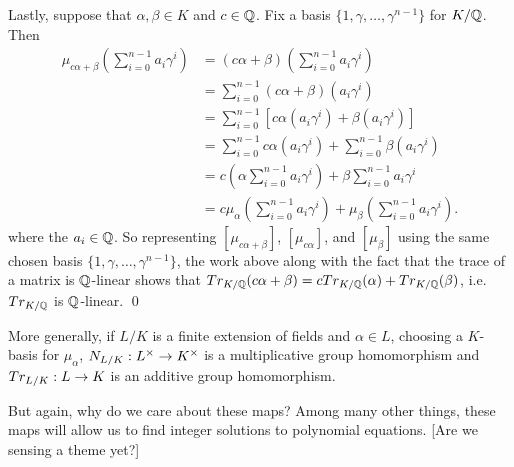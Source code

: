 Lastly, suppose that $\alpha, \beta \in K$ and $c \in \mathbb{Q}$. Fix a basis $\{1, \gamma, \ldots, \gamma^{n-1} \}$ for $K/\mathbb{Q}$. Then
	\[
	\begin{split}
	\mu_{c\alpha + \beta}\left(\sum_{i=0}^{n-1} a_i \gamma^i \right)&= (c\alpha + \beta) \left(\sum_{i=0}^{n-1} a_i \gamma^i \right) \\
	&= \sum_{i=0}^{n-1} (c\alpha + \beta)(a_i \gamma^i) \\
	&= \sum_{i=0}^{n-1} \left[ c\alpha (a_i \gamma^i) + \beta (a_i \gamma^i) \right] \\
	&=  \sum_{i=0}^{n-1} c\alpha (a_i \gamma^i) + \sum_{i=0}^{n-1} \beta (a_i \gamma^i) \\
	&= c \left(\alpha \sum_{i=0}^{n-1} a_i \gamma^i \right) + \beta \sum_{i=0}^{n-1} a_i \gamma^i \\
	&= c\mu_{\alpha} \left( \sum_{i=0}^{n-1} a_i \gamma^i \right) + \mu_\beta \left( \sum_{i=0}^{n-1} a_i \gamma^i \right).
	\end{split}
	\]
where the $a_i \in \mathbb{Q}$. So representing $[\mu_{c\alpha+\beta}]$, $[\mu_{c\alpha}]$, and $[\mu_\beta]$ using the same chosen basis $\{1, \gamma, \ldots, \gamma^{n-1} \}$, the work above along with the fact that the trace of a matrix is $\mathbb{Q}$-linear shows that $Tr_{K/\mathbb{Q}}(c\alpha+ \beta)= cTr_{K/\mathbb{Q}}(\alpha) + Tr_{K/\mathbb{Q}}(\beta)$, i.e. $Tr_{K/\mathbb{Q}}$ is $\mathbb{Q}$-linear. \qed \pskip


\begin{rem}
More generally, if $L/K$ is a finite extension of fields and $\alpha \in L$, choosing a $K$-basis for $\mu_\alpha$, $N_{L/K}: L^\times \to K^\times$ is a multiplicative group homomorphism and $Tr_{L/K}: L \to K$ is an additive group homomorphism. 
\end{rem}


But again, why do we care about these maps? Among many other things, these maps will allow us to find integer solutions to polynomial equations. [Are we sensing a theme yet?] 


